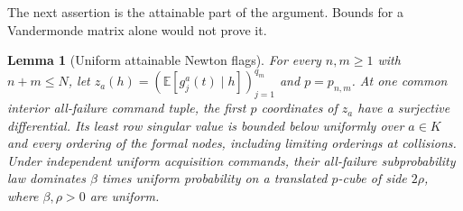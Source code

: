 \documentclass[11pt]{amsart}
\newtheorem{lemma}[theorem]{Lemma}
\theoremstyle{definition}\newtheorem{definition}[theorem]{Definition}
\theoremstyle{remark}\newtheorem{remark}[theorem]{Remark}
\newcommand{\E}{\mathbb E}\newcommand{\Prob}{\mathbb P}
\begin{document}
The next assertion is the attainable part of the argument. Bounds for a
Vandermonde matrix alone would not prove it.

\begin{lemma}[Uniform attainable Newton flags]\label{lem:newton-attainment}
For every $n,m\ge1$ with $n+m\le N$, let
$z_a(h)=(\E[g_j^a(t)\mid h])_{j=1}^{q_m}$ and
$p=p_{n,m}$. At one common interior all-failure command tuple, the first
$p$ coordinates of $z_a$ have a surjective differential. Its least row
singular value is bounded below uniformly over $a\in K$ and every
ordering of the formal nodes, including limiting orderings at collisions.
Under independent uniform acquisition commands, their all-failure
subprobability law dominates $\beta$ times uniform probability on a
translated $p$-cube of side $2\rho$, where $\beta,\rho>0$ are uniform.
\end{lemma}
\end{document}
